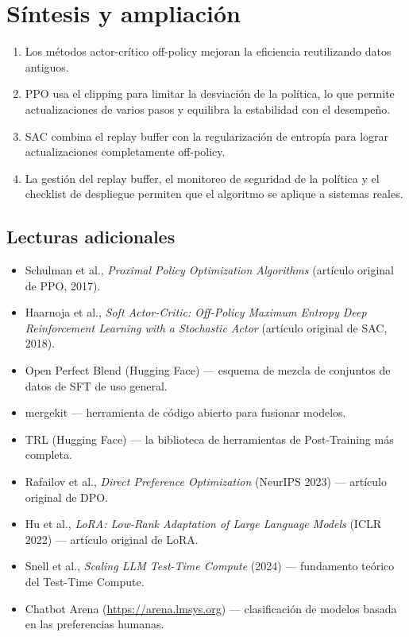 \section{Síntesis y ampliación}

\begin{enumerate}
    \item Los métodos actor-crítico off-policy mejoran la eficiencia reutilizando datos antiguos.
    \item PPO usa el clipping para limitar la desviación de la política, lo que permite actualizaciones de varios pasos y equilibra la estabilidad con el desempeño.
    \item SAC combina el replay buffer con la regularización de entropía para lograr actualizaciones completamente off-policy.
    \item La gestión del replay buffer, el monitoreo de seguridad de la política y el checklist de despliegue permiten que el algoritmo se aplique a sistemas reales.
\end{enumerate}

\subsection{Lecturas adicionales}
\begin{itemize}
    \item Schulman et al., \textit{Proximal Policy Optimization Algorithms} (artículo original de PPO, 2017).
    \item Haarnoja et al., \textit{Soft Actor-Critic: Off-Policy Maximum Entropy Deep Reinforcement Learning with a Stochastic Actor} (artículo original de SAC, 2018).
    \item Open Perfect Blend (Hugging Face) — esquema de mezcla de conjuntos de datos de SFT de uso general.
    \item mergekit — herramienta de código abierto para fusionar modelos.
    \item TRL (Hugging Face) — la biblioteca de herramientas de Post-Training más completa.
    \item Rafailov et al., \textit{Direct Preference Optimization} (NeurIPS 2023) — artículo original de DPO.
    \item Hu et al., \textit{LoRA: Low-Rank Adaptation of Large Language Models} (ICLR 2022) — artículo original de LoRA.
    \item Snell et al., \textit{Scaling LLM Test-Time Compute} (2024) — fundamento teórico del Test-Time Compute.
    \item Chatbot Arena (\url{https://arena.lmsys.org}) — clasificación de modelos basada en las preferencias humanas.
\end{itemize}


